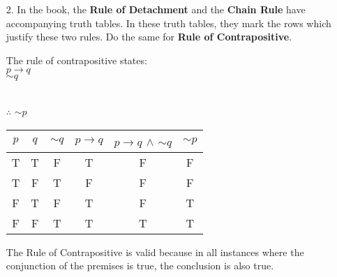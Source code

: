 \documentclass{article}
\begin{document}
\begin{itemize}
    
    (d) All multiples of 2 are even.\\
    \hspace*{0.6cm}18 is a multiple of 3\\
    \\
    \hspace*{0.6cm}18 is even.
    
    
    \item[2.] In the book, the \textbf{Rule of Detachment} and the \textbf{Chain Rule} have accompanying truth tables.  In these truth tables, they mark the rows which justify these two rules.  Do the same for \textbf{Rule of Contrapositive}.
    
    The rule of contrapositive states:\\
    \hspace*{0.6cm}$p \to q$\\
    \hspace*{0.6cm}$\sim q$\\
    \\
    \hspace*{0.6cm}$\therefore$ $ \sim p$
    
    \begin{centering}
        \begin{tabular}{|c|c|c|c|c|c|}
            \hline
            $p$ & $q$ & $\sim q$ & $p \to q$ & $p \to q$ $\wedge$ $\sim q$ & $\sim p$\\
            \hline
            T & T & F & T & F & F\\
            \hline
            T & F & T & F & F & F\\
            \hline
            F & T & F & T & F & T\\
            \hline
            \rowcolor{LightCyan}
            F & F & T & T & T & T\\
            \hline
        \end{tabular}
    \end{centering}
    
    {\color{blue} The Rule of Contrapositive is valid because in all instances where the conjunction of the premises is true, the conclusion is also true.}
\end{itemize}
\end{document}
